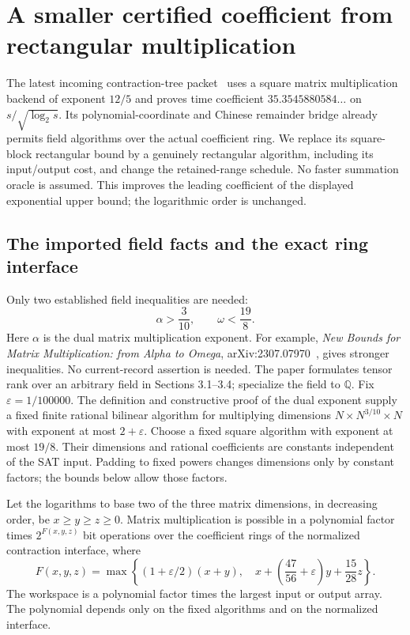 \section{A smaller certified coefficient from rectangular multiplication}
\label{sec:rectangular-new}

The latest incoming contraction-tree packet~\cite{tree} uses a square matrix multiplication
backend of exponent $12/5$ and proves time coefficient $35.3545880584\ldots$
on $s/\sqrt{\log_2s}$. Its polynomial-coordinate and Chinese remainder bridge
already permits field algorithms over the actual coefficient ring. We replace
its square-block rectangular bound by a genuinely rectangular algorithm,
including its input/output cost, and change the retained-range schedule.
No faster summation oracle is assumed. This improves the leading coefficient
of the displayed exponential upper bound; the logarithmic order is unchanged.

\subsection{The imported field facts and the exact ring interface}

Only two established field inequalities are needed:
\[
 \alpha>\frac3{10},\qquad \omega<\frac{19}{8}.
\]
Here $\alpha$ is the dual matrix multiplication exponent. For example,
\emph{New Bounds for Matrix Multiplication: from Alpha to Omega},
arXiv:2307.07970~\cite{mm}, gives stronger inequalities. No current-record assertion is
needed. The paper formulates tensor rank over an arbitrary field in
Sections 3.1--3.4; specialize the field to $\mathbb Q$. Fix $\varepsilon=1/100000$. The definition and constructive proof of
the dual exponent supply a fixed finite rational bilinear algorithm for
multiplying dimensions $N\times N^{3/10}\times N$ with exponent at most
$2+\varepsilon$. Choose a fixed square algorithm with exponent at most
$19/8$. Their dimensions and rational coefficients are constants independent
of the SAT input. Padding to fixed powers changes dimensions only by constant
factors; the bounds below allow those factors.

\begin{lemma}
\label{lem:rectangular-new}
Let the logarithms to base two of the three matrix dimensions, in decreasing
order, be $x\ge y\ge z\ge0$. Matrix multiplication is possible in a polynomial
factor times $2^{F(x,y,z)}$ bit operations over the coefficient rings of the
normalized contraction interface, where
\begin{equation}\label{eq:rectangular-new-cost}
 F(x,y,z)=\max\left\{
 (1+\varepsilon/2)(x+y),\quad
 x+\left(\frac{47}{56}+\varepsilon\right)y+\frac{15}{28}z
 \right\}.
\end{equation}
The workspace is a polynomial factor times the largest input or output
array. The polynomial depends only on the fixed algorithms and on the
normalized interface.
\end{lemma}

